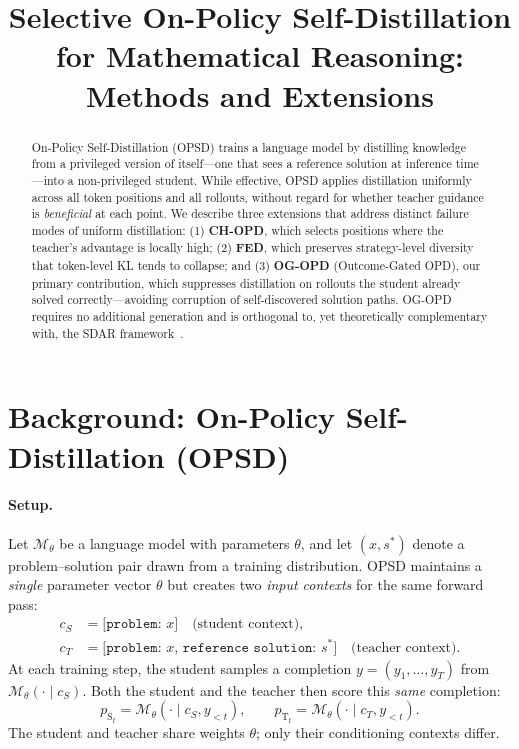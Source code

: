 \documentclass[11pt]{article}
\title{Selective On-Policy Self-Distillation for Mathematical Reasoning:\\
       Methods and Extensions}
\author{}
\date{}
\newcommand{\pT}{p_{\mathrm{T}}}
\newcommand{\pS}{p_{\mathrm{S}}}
\begin{document}
\maketitle

\begin{abstract}
On-Policy Self-Distillation (OPSD) trains a language model by distilling knowledge from a
privileged version of itself—one that sees a reference solution at inference time—into a
non-privileged student.  While effective, OPSD applies distillation uniformly across all
token positions and all rollouts, without regard for whether teacher guidance is
\emph{beneficial} at each point.  We describe three extensions that address distinct failure
modes of uniform distillation: (1) \textbf{CH-OPD}, which selects positions where
the teacher's advantage is locally high; (2) \textbf{FED}, which preserves strategy-level
diversity that token-level KL tends to collapse; and (3) \textbf{OG-OPD}
(Outcome-Gated OPD), our primary contribution, which suppresses distillation on
rollouts the student already solved correctly—avoiding corruption of self-discovered solution
paths.  OG-OPD requires no additional generation and is orthogonal to, yet theoretically
complementary with, the SDAR framework~\cite{sdar2025}.
\end{abstract}

\section{Background: On-Policy Self-Distillation (OPSD)}
\label{sec:opsd}

\paragraph{Setup.}
Let $\mathcal{M}_\theta$ be a language model with parameters $\theta$, and let $(x, s^*)$
denote a problem–solution pair drawn from a training distribution.  OPSD maintains a
\emph{single} parameter vector $\theta$ but creates two \emph{input contexts} for the same
forward pass:
\begin{align*}
  c_S &= \texttt{[problem: } x\texttt{]}
       \quad\text{(student context)},\\
  c_T &= \texttt{[problem: } x\texttt{, reference solution: } s^*\texttt{]}
       \quad\text{(teacher context)}.
\end{align*}
At each training step, the student samples a completion $y = (y_1,\dots,y_T)$ from
$\mathcal{M}_\theta(\cdot \mid c_S)$.  Both the student and the teacher then score this
\emph{same} completion:
\[
  \pS_t = \mathcal{M}_\theta(\cdot \mid c_S, y_{<t}), \qquad
  \pT_t = \mathcal{M}_\theta(\cdot \mid c_T, y_{<t}).
\]
The student and teacher share weights $\theta$; only their conditioning contexts differ.
\end{document}
